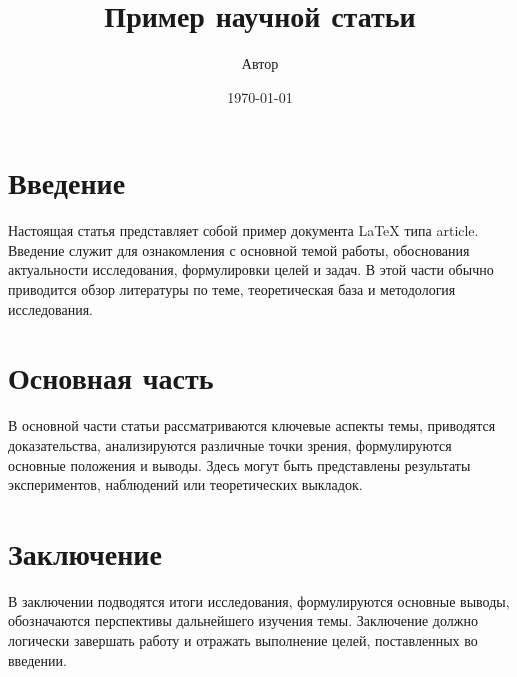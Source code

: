 \documentclass{article}
\title{Пример научной статьи}
\author{Автор}
\date{\today}
\begin{document}
\maketitle

\section{Введение}
Настоящая статья представляет собой пример документа \LaTeX{} типа article. Введение служит для ознакомления с основной темой работы, обоснования актуальности исследования, формулировки целей и задач. В этой части обычно приводится обзор литературы по теме, теоретическая база и методология исследования.

\section{Основная часть}
В основной части статьи рассматриваются ключевые аспекты темы, приводятся доказательства, анализируются различные точки зрения, формулируются основные положения и выводы. Здесь могут быть представлены результаты экспериментов, наблюдений или теоретических выкладок.

\section{Заключение}
В заключении подводятся итоги исследования, формулируются основные выводы, обозначаются перспективы дальнейшего изучения темы. Заключение должно логически завершать работу и отражать выполнение целей, поставленных во введении.



\end{document}
